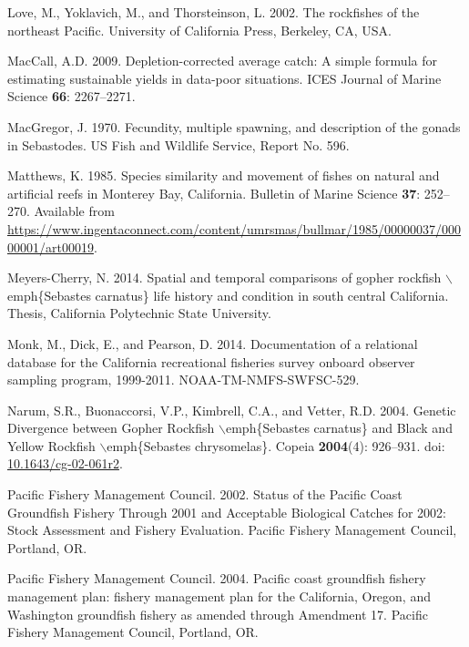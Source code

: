\documentclass[12pt,]{article}
\begin{document}
\hypertarget{ref-Love2002}{}
Love, M., Yoklavich, M., and Thorsteinson, L. 2002. The rockfishes of
the northeast Pacific. University of California Press, Berkeley, CA,
USA.

\hypertarget{ref-MacCall2009}{}
MacCall, A.D. 2009. Depletion-corrected average catch: A simple formula
for estimating sustainable yields in data-poor situations. ICES Journal
of Marine Science \textbf{66}: 2267--2271.

\hypertarget{ref-MacGregor1970}{}
MacGregor, J. 1970. Fecundity, multiple spawning, and description of the
gonads in Sebastodes. US Fish and Wildlife Service, Report No. 596.

\hypertarget{ref-Matthews1985}{}
Matthews, K. 1985. Species similarity and movement of fishes on natural
and artificial reefs in Monterey Bay, California. Bulletin of Marine
Science \textbf{37}: 252--270. Available from
\url{https://www.ingentaconnect.com/content/umrsmas/bullmar/1985/00000037/00000001/art00019}.

\hypertarget{ref-MeyersCherry2014}{}
Meyers-Cherry, N. 2014. Spatial and temporal comparisons of gopher
rockfish \(\backslash\)emph\{Sebastes carnatus\} life history and
condition in south central California. Thesis, California Polytechnic
State University.

\hypertarget{ref-Monk2014}{}
Monk, M., Dick, E., and Pearson, D. 2014. Documentation of a relational
database for the California recreational fisheries survey onboard
observer sampling program, 1999-2011. NOAA-TM-NMFS-SWFSC-529.

\hypertarget{ref-Narum2004}{}
Narum, S.R., Buonaccorsi, V.P., Kimbrell, C.A., and Vetter, R.D. 2004.
Genetic Divergence between Gopher Rockfish \(\backslash\)emph\{Sebastes
carnatus\} and Black and Yellow Rockfish \(\backslash\)emph\{Sebastes
chrysomelas\}. Copeia \textbf{2004}(4): 926--931. doi:
\href{https://doi.org/10.1643/cg-02-061r2}{10.1643/cg-02-061r2}.

\hypertarget{ref-PFMC2002}{}
Pacific Fishery Management Council. 2002. Status of the Pacific Coast
Groundfish Fishery Through 2001 and Acceptable Biological Catches for
2002: Stock Assessment and Fishery Evaluation. Pacific Fishery
Management Council, Portland, OR.

\hypertarget{ref-PFMC2004}{}
Pacific Fishery Management Council. 2004. Pacific coast groundfish
fishery management plan: fishery management plan for the California,
Oregon, and Washington groundfish fishery as amended through Amendment
17. Pacific Fishery Management Council, Portland, OR.
\end{document}
